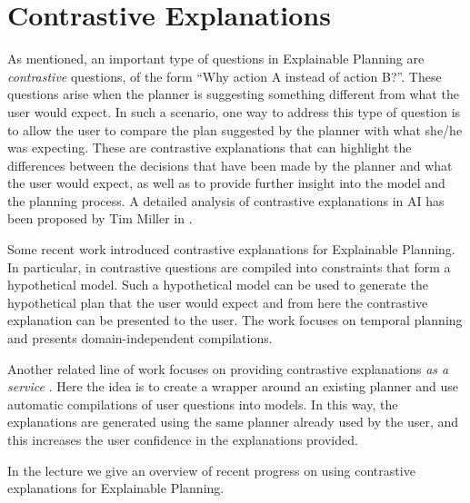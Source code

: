 \section{Contrastive Explanations}
\label{contrastive}




As mentioned, an important type of questions in Explainable Planning
are \textit{contrastive} questions, of the form ``Why action A instead
of action B?''.  These questions arise when the planner is suggesting
something different from what the user would expect. In such a
scenario, one way to address this type of question is to allow the
user to compare the plan suggested by the planner with what she/he was
expecting.  These are contrastive explanations that can highlight the
differences between the decisions that have been made by the planner
and what the user would expect, as well as to provide further insight
into the model and the planning process. A detailed analysis of
contrastive explanations in AI has been proposed by Tim Miller in
\cite{miller:corr-18}.

Some recent work introduced contrastive explanations for Explainable
Planning. In particular, in \cite{ben} contrastive questions are
compiled into constraints that form a hypothetical model. Such a
hypothetical model can be used to generate the hypothetical plan that
the user would expect and from here the contrastive explanation can be
presented to the user. The work focuses on temporal planning and
presents domain-independent compilations.
%

Another related line of work focuses on providing contrastive
explanations \textit{as a service} \cite{xaipservice}. Here the idea
is to create a wrapper around an existing planner and use automatic
compilations of user questions into models. In this way, the
explanations are generated using the same planner already used by the
user, and this increases the user confidence in the explanations
provided.

In the lecture we give an overview of recent progress on using
contrastive explanations for Explainable Planning.
